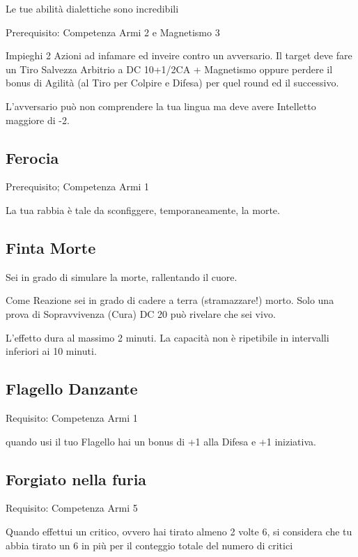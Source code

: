 \documentclass[a4paper,11pt,twoside,openany]{book}
\begin{document}
Le tue abilità dialettiche sono incredibili

Prerequisito: Competenza Armi 2 e Magnetismo 3

Impieghi 2 Azioni ad infamare ed inveire contro un avversario. Il target deve fare un Tiro Salvezza Arbitrio a DC 10+1/2CA + Magnetismo oppure perdere il bonus di Agilità (al Tiro per Colpire e Difesa) per quel round ed il successivo.

L'avversario può non comprendere la tua lingua ma deve avere Intelletto maggiore di -2.

\subsection{Ferocia}

Prerequisito; Competenza Armi 1

La tua rabbia è tale da sconfiggere, temporaneamente, la morte.

\subsection{Finta Morte}

Sei in grado di simulare la morte, rallentando il cuore.

Come Reazione sei in grado di cadere a terra (stramazzare!) morto. Solo una prova di Sopravvivenza (Cura) DC 20 può rivelare che sei vivo.

L'effetto dura al massimo 2 minuti. La capacità non è ripetibile in intervalli inferiori ai 10 minuti.

\subsection{Flagello Danzante}

Requisito: Competenza Armi 1

quando usi il tuo Flagello hai un bonus di +1 alla Difesa e +1 iniziativa.

\subsection{Forgiato nella furia}

Requisito: Competenza Armi 5

Quando effettui un critico, ovvero hai tirato almeno 2 volte 6, si considera che tu abbia tirato un 6 in più per il conteggio totale del numero di critici
\end{document}
